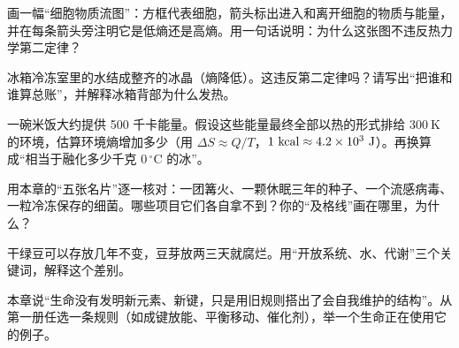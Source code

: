 \begin{sikaoti}
\item 画一幅“细胞物质流图”：方框代表细胞，箭头标出进入和离开细胞的物质与能量，并在每条箭头旁注明它是低熵还是高熵。用一句话说明：为什么这张图不违反热力学第二定律？
\item 冰箱冷冻室里的水结成整齐的冰晶（熵降低）。这违反第二定律吗？请写出“把谁和谁算总账”，并解释冰箱背部为什么发热。
\item 一碗米饭大约提供 500 千卡能量。假设这些能量最终全部以热的形式排给 $300\ \mathrm{K}$ 的环境，估算环境熵增加多少（用 $\Delta S \approx Q/T$，$1\ \mathrm{kcal}\approx4.2\times 10^{3}\ \mathrm{J}$）。再换算成“相当于融化多少千克 $0\,^{\circ}\mathrm{C}$ 的冰”。
\item 用本章的“五张名片”逐一核对：一团篝火、一颗休眠三年的种子、一个流感病毒、一粒冷冻保存的细菌。哪些项目它们各自拿不到？你的“及格线”画在哪里，为什么？
\item 干绿豆可以存放几年不变，豆芽放两三天就腐烂。用“开放系统、水、代谢”三个关键词，解释这个差别。
\item 本章说“生命没有发明新元素、新键，只是用旧规则搭出了会自我维护的结构”。从第一册任选一条规则（如成键放能、平衡移动、催化剂），举一个生命正在使用它的例子。
\end{sikaoti}
